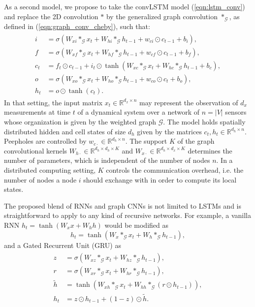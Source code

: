 \documentclass{article} %
\newcommand{\R}{\mathbb{R}}
\newcommand{\G}{\mathcal{G}}
\newcommand{\eqnref}[1]{(\ref{eqn:#1})}
\begin{document}
As a second model, we propose to take the convLSTM model \eqnref{lstm_conv} and
replace the 2D convolution $\ast$ by the generalized graph convolution
$\ast_\G$, as defined in \eqnref{graph_conv_cheby}, such that:
\begin{align} \label{eqn:lstm_graph}
\begin{split}
	i &= \sigma(W_{xi} \ast_\G x_t + W_{hi} \ast_\G h_{t-1} + w_{ci} \odot c_{t-1} + b_i), \\
	f &= \sigma(W_{xf} \ast_\G x_t + W_{hf} \ast_\G h_{t-1} + w_{cf} \odot c_{t-1} + b_f), \\
	c_t &= f_t \odot c_{t-1} + i_t \odot \tanh(W_{xc} \ast_\G x_t + W_{hc} \ast_\G h_{t-1} + b_c), \\
	o &= \sigma(W_{xo} \ast_\G x_t + W_{ho} \ast_\G h_{t-1} + w_{co} \odot c_t + b_o), \\
	h_t &= o \odot \tanh(c_t).
\end{split}
\end{align}
In that setting, the input matrix $x_t \in \R^{d_x \times n}$ may represent the
observation of $d_x$ measurements at time $t$ of a dynamical system over a
network of $n = |V|$ sensors whose organization is given by the weighted graph
$\G$. The model holds spatially distributed hidden and cell states of size
$d_h$ given by the matrices $c_t, h_t \in \R^{d_h \times n}$. Peepholes are
controlled by $w_{c\cdot} \in \R^{d_h \times n}$. The support $K$ of the graph
convolutional kernels $W_{h\cdot} \in \R^{d_h \times d_h \times K}$ and
$W_{x\cdot} \in \R^{d_h \times d_x \times K}$ determines the number of
parameters, which is independent of the number of nodes $n$. In a distributed
computing setting, $K$ controls the communication overhead, i.e. the number of
nodes a node $i$ should exchange with in order to compute its local states.

The proposed blend of RNNs and graph CNNs is not limited to LSTMs and is
straightforward to apply to any kind of recursive networks. For example, a
vanilla RNN $h_t = \tanh(W_x x + W_h h)$ would be modified as
\begin{equation} \label{eqn:vrnn_graph}
	h_t = \tanh(W_x \ast_\G x_t + W_h \ast_\G h_{t-1}),
\end{equation}
and a Gated Recurrent Unit (GRU) \citep{gru} as
\begin{align} \label{eqn:gru_graph}
\begin{split}
	z &= \sigma(W_{xz} \ast_\G x_t + W_{hz} \ast_\G h_{t-1}), \\
	r &= \sigma(W_{xr} \ast_\G x_t + W_{hr} \ast_\G h_{t-1}), \\
	\tilde{h} &= \tanh(W_{xh} \ast_\G x_t + W_{hh} \ast_\G (r \odot h_{t-1})), \\
	h_t &= z \odot h_{t-1} + (1-z) \odot \tilde{h}.
\end{split}
\end{align}
\end{document}

